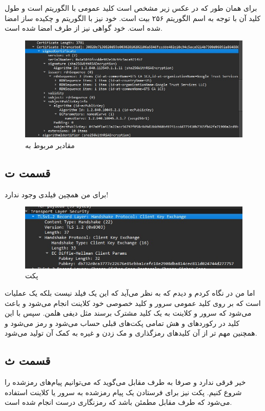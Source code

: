 \documentclass[]{article}
\begin{document}
برای
همان طور که در عکس زیر مشخص است کلید عمومی با الگوریتم
است و طول کلید آن با توجه به اسم الگوریتم ۲۵۶ بیت است. خود
نیز با الگوریتم
 و چکیده ساز 
امضا شده است. خود گواهی نیز از طرف
امضا شده است.
\begin{figure}[h]
    \centering
    \includegraphics[scale=0.5]{pics/tls-cert.jpg}
    \caption{مقادیر مربوط به }
\end{figure}
\subsection*{قسمت ت}
برای من همچین فیلدی وجود ندارد!
\begin{figure}[h]
    \centering
    \includegraphics[scale=0.5]{pics/tls-client-key-exchange.jpg}
    \caption{پکت }
\end{figure}
اما من در
نگاه کردم و دیدم که به نظر می‌آید که این یک فیلد نیست بلکه یک عملیات است که بر روی کلید عمومی
سرور و کلید خصوصی خود کلاینت انجام می‌شود و باعث می‌شود که سرور و کلاینت به یک کلید مشترک برسند مثل دیفی هلمن.
سپس با این کلید در رکورد‌های
 و 
هش تمامی پکت‌های قبلی حساب می‌شود و رمز می‌شود و همچنین مهم تر از آن کلید‌های رمزگذاری و مک زدن و غیره به کمک آن تولید می‌شود.
\subsection*{قسمت ث}
خیر فرقی ندارد و صرفا به طرف مقابل می‌گوید که می‌توانیم پیام‌های رمزشده را شروع کنیم. پکت
نیز برای فرستادن یک پیام رمزشده به سرور یا کلاینت استفاده می‌شود که طرف مقابل مطمئن باشد که
رمزنگاری درست انجام شده است.
\end{document}

